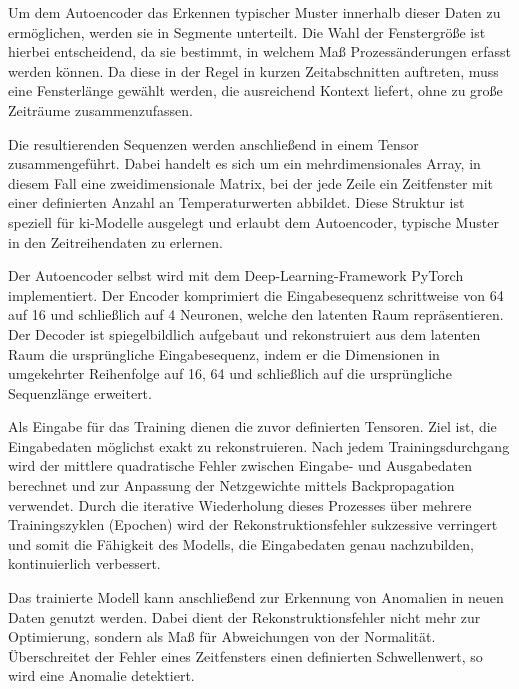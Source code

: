 Um dem Autoencoder das Erkennen typischer Muster innerhalb dieser Daten zu ermöglichen, werden sie in Segmente unterteilt.
Die Wahl der Fenstergröße ist hierbei entscheidend, da sie bestimmt, in welchem Maß Prozessänderungen erfasst werden können.
Da diese in der Regel in kurzen Zeitabschnitten auftreten, muss eine Fensterlänge gewählt werden, die ausreichend Kontext liefert, ohne zu große Zeiträume zusammenzufassen.

Die resultierenden Sequenzen werden anschließend in einem Tensor zusammengeführt. 
Dabei handelt es sich um ein mehrdimensionales Array, in diesem Fall eine zweidimensionale Matrix, bei der jede Zeile ein Zeitfenster mit einer definierten Anzahl an Temperaturwerten abbildet. 
Diese Struktur ist speziell für \acs{ki}-Modelle ausgelegt und erlaubt dem Autoencoder, typische Muster in den Zeitreihendaten zu erlernen.

Der Autoencoder selbst wird mit dem Deep-Learning-Framework PyTorch \cite{PyTorch} implementiert.
Der Encoder komprimiert die Eingabesequenz schrittweise von 64 auf 16 und schließlich auf 4 Neuronen, welche den latenten Raum repräsentieren.
Der Decoder ist spiegelbildlich aufgebaut und rekonstruiert aus dem latenten Raum die ursprüngliche Eingabesequenz, indem er die Dimensionen in umgekehrter Reihenfolge auf 16, 64 und schließlich auf die ursprüngliche Sequenzlänge erweitert.

Als Eingabe für das Training dienen die zuvor definierten Tensoren.
Ziel ist, die Eingabedaten möglichst exakt zu rekonstruieren.
Nach jedem Trainingsdurchgang wird der mittlere quadratische Fehler zwischen Eingabe- und Ausgabedaten berechnet und zur Anpassung der Netzgewichte mittels Backpropagation verwendet.
Durch die iterative Wiederholung dieses Prozesses über mehrere Trainingszyklen (Epochen) wird der Rekonstruktionsfehler sukzessive verringert und somit die Fähigkeit des Modells, die Eingabedaten genau nachzubilden, kontinuierlich verbessert.

Das trainierte Modell kann anschließend zur Erkennung von Anomalien in neuen Daten genutzt werden.
Dabei dient der Rekonstruktionsfehler nicht mehr zur Optimierung, sondern als Maß für Abweichungen von der Normalität.
Überschreitet der Fehler eines Zeitfensters einen definierten Schwellenwert, so wird eine Anomalie detektiert.


